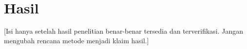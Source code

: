 \chapter{Hasil}
[Isi hanya setelah hasil penelitian benar-benar tersedia dan terverifikasi. Jangan mengubah rencana metode menjadi klaim hasil.]
